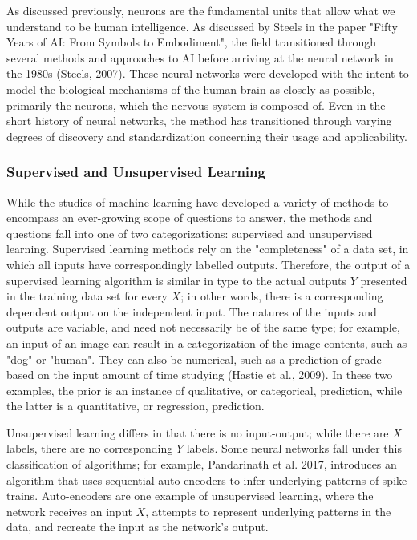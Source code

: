 \documentclass{article}
\begin{document}
As discussed previously, neurons are the fundamental units that allow what we understand to be human intelligence. As discussed by Steels in the paper "Fifty Years of AI: From Symbols to Embodiment", the field transitioned through several methods and approaches to AI before arriving at the neural network in the 1980s (Steels, 2007). These neural networks were developed with the intent to model the biological mechanisms of the human brain as closely as possible, primarily the neurons, which the nervous system is composed of. Even in the short history of neural networks, the method has transitioned through varying degrees of discovery and standardization concerning their usage and applicability.\par

\subsubsection{Supervised and Unsupervised Learning}
While the studies of machine learning have developed a variety of methods to encompass an ever-growing scope of questions to answer, the methods and questions fall into one of two categorizations: supervised and unsupervised learning. Supervised learning methods rely on the "completeness" of a data set, in which all inputs have correspondingly labelled outputs. Therefore, the output of a supervised learning algorithm is similar in type to the actual outputs $Y$ presented in the training data set for every $X$; in other words, there is a corresponding dependent output on the independent input. The natures of the inputs and outputs are variable, and need not necessarily be of the same type; for example, an input of an image can result in a categorization of the image contents, such as "dog" or "human". They can also be numerical, such as a prediction of grade based on the input amount of time studying (Hastie et al., 2009). In these two examples, the prior is an instance of qualitative, or categorical, prediction, while the latter is a quantitative, or regression, prediction.\par

Unsupervised learning differs in that there is no input-output; while there are $X$ labels, there are no corresponding $Y$ labels. Some neural networks fall under this classification of algorithms; for example, Pandarinath et al. 2017, introduces an algorithm that uses sequential auto-encoders to infer underlying patterns of spike trains. Auto-encoders are one example of unsupervised learning, where the network receives an input $X$, attempts to represent underlying patterns in the data, and recreate the input as the network's output. 
\end{document}
